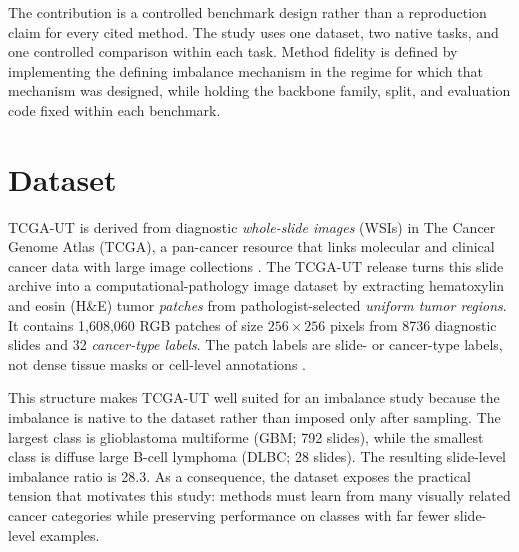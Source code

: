 \documentclass[11pt]{article}
\begin{document}
The contribution is a controlled benchmark design rather than a reproduction claim for every cited method. The study uses one dataset, two native tasks, and one controlled comparison within each task. Method fidelity is defined by implementing the defining imbalance mechanism in the regime for which that mechanism was designed, while holding the backbone family, split, and evaluation code fixed within each benchmark.

\section{Dataset}
TCGA-UT is derived from diagnostic \emph{whole-slide images} (WSIs) in The Cancer Genome Atlas (TCGA), a pan-cancer resource that links molecular and clinical cancer data with large image collections \citep{tomczak2015reviewThe}. The TCGA-UT release turns this slide archive into a computational-pathology image dataset by extracting hematoxylin and eosin (H\&E) tumor \emph{patches} from pathologist-selected \emph{uniform tumor regions}. It contains 1,608,060 RGB patches of size $256\times256$ pixels from 8736 diagnostic slides and 32 \emph{cancer-type labels}. The patch labels are slide- or cancer-type labels, not dense tissue masks or cell-level annotations \citep{komura2022universalEncoding}.

This structure makes TCGA-UT well suited for an imbalance study because the imbalance is native to the dataset rather than imposed only after sampling. The largest class is glioblastoma multiforme (GBM; 792 slides), while the smallest class is diffuse large B-cell lymphoma (DLBC; 28 slides). The resulting slide-level imbalance ratio is 28.3. As a consequence, the dataset exposes the practical tension that motivates this study: methods must learn from many visually related cancer categories while preserving performance on classes with far fewer slide-level examples.
\end{document}
